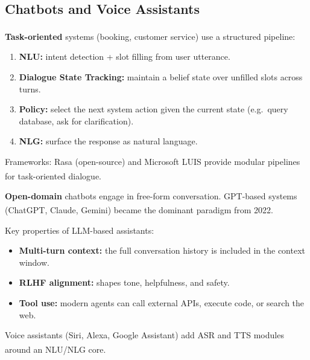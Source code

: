 \subsection{Chatbots and Voice Assistants}

\begin{tcbitemize}[ skin=sectionraster ]

    \tcbitem[title=Task-Oriented Dialogue Systems, raster multicolumn=3]
    \textbf{Task-oriented} systems (booking, customer service) use a structured
    pipeline:\textsuperscript{\cite[][p.~11]{dhamaniIntroductionGenerativeAI2024}}
    \begin{enumerate}
        \item \textbf{NLU:} intent detection + slot filling from user utterance.
        \item \textbf{Dialogue State Tracking:} maintain a belief state over unfilled
              slots across turns.
        \item \textbf{Policy:} select the next system action given the current state
              (e.g.\ query database, ask for clarification).
        \item \textbf{NLG:} surface the response as natural language.
    \end{enumerate}
    Frameworks: Rasa (open-source) and Microsoft LUIS provide modular pipelines for
    task-oriented
    dialogue.\textsuperscript{\cite[][p.~11]{dhamaniIntroductionGenerativeAI2024}}

    \tcbitem[title={Open-Domain and LLM-Based Assistants}, raster multicolumn=3]
    \textbf{Open-domain} chatbots engage in free-form conversation. GPT-based systems
    (ChatGPT, Claude, Gemini) became the dominant paradigm from
    2022.\textsuperscript{\cite[][p.~1]{farrisHowLargeLanguage2025}}

    Key properties of LLM-based assistants:
    \begin{itemize}
        \item \textbf{Multi-turn context:} the full conversation history is included in
              the context window.
        \item \textbf{RLHF alignment:} shapes tone, helpfulness, and safety.
        \item \textbf{Tool use:} modern agents can call external APIs, execute code, or
              search the web.
    \end{itemize}

    Voice assistants (Siri, Alexa, Google Assistant) add ASR and TTS modules around an
    NLU/NLG
    core.\textsuperscript{\cite[][p.~11]{dhamaniIntroductionGenerativeAI2024}}

\end{tcbitemize}

